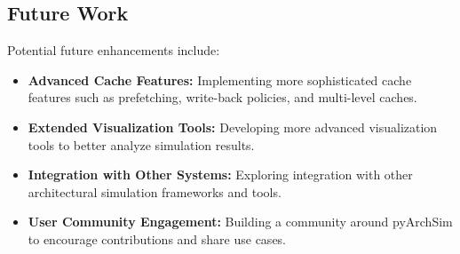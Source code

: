\documentclass[12pt,a4paper]{report}
\begin{document}
\subsection{Future Work}
Potential future enhancements include:
\begin{itemize}
  \item \textbf{Advanced Cache Features:} Implementing more sophisticated cache features such as prefetching, write-back policies, and multi-level caches.
  \item \textbf{Extended Visualization Tools:} Developing more advanced visualization tools to better analyze simulation results.
  \item \textbf{Integration with Other Systems:} Exploring integration with other architectural simulation frameworks and tools.
  \item \textbf{User Community Engagement:} Building a community around pyArchSim to encourage contributions and share use cases.
\end{itemize}



\end{document}
